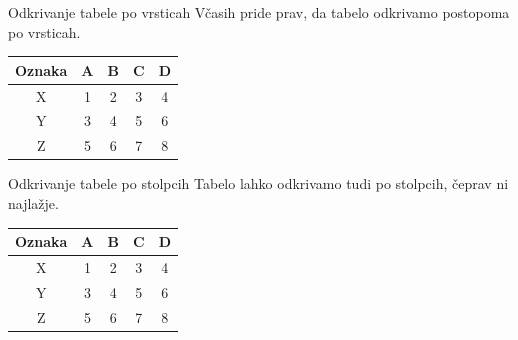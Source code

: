 \begin{frame}{Odkrivanje tabele po vrsticah}
	Včasih pride prav, da tabelo odkrivamo postopoma po vrsticah.
	\begin{center}
		\begin{tabular}{c|cccc}
		   Oznaka & A & B & C & D \\ \hline \pause
		   X & 1 & 2 & 3 & 4 \\ \pause
		   Y & 3 & 4 & 5 & 6 \\ \pause
		   Z & 5 & 6 & 7 & 8 \pause
		\end{tabular}
	\end{center}
\end{frame}
 

\begin{frame}{Odkrivanje tabele po stolpcih}
	Tabelo lahko odkrivamo tudi po stolpcih, čeprav ni najlažje.

	\begin{center}
		\begin{tabular}{c|
    c<{\onslide<3->} 
    c<{\onslide<4->} 
    c<{\onslide<5->} 
    c<{\onslide<2->}}
			Oznaka & A & B & C & D \\ \hline
		    X & 1 & 2 & 3 & 4 \\
		    Y & 3 & 4 & 5 & 6 \\
		    Z & 5 & 6 & 7 & 8
		\end{tabular}
	\end{center}
\end{frame}
